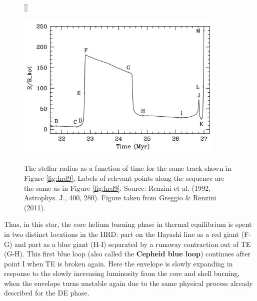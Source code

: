 \documentclass[a4paper,10pt]{article}
\begin{document}
\begin{figure}[h]
    [\FBwidth]
    {\caption{\footnotesize{The stellar radius as a function of time for the same track shown in Figure \ref{fig:hrd9}. Labels of relevant points along the sequence are the same as in Figure \ref{fig:hrd9}. Source: Renzini et al. (1992, Astrophys. J., 400, 280). Figure taken from Greggio \& Renzini (2011).}}
    \label{fig:rvst}}
    {\includegraphics[width=10cm]{figures/RvsT.png}}
\end{figure}

{\noindent}Thus, in this star, the core helium burning phase in thermal equilibrium is spent in two distinct locations in the HRD: part on the Hayashi line as a red giant (F-G) and part as a blue giant (H-I) separated by a runaway contraction out of TE (G-H). This first blue loop (also called the \textbf{Cepheid blue loop}) continues after point I when TE is broken again. Here the envelope is slowly expanding in response to the slowly increasing luminosity from the core and shell burning, when the envelope turns unstable again due to the same physical process already described for the DE phase. 
\end{document}
